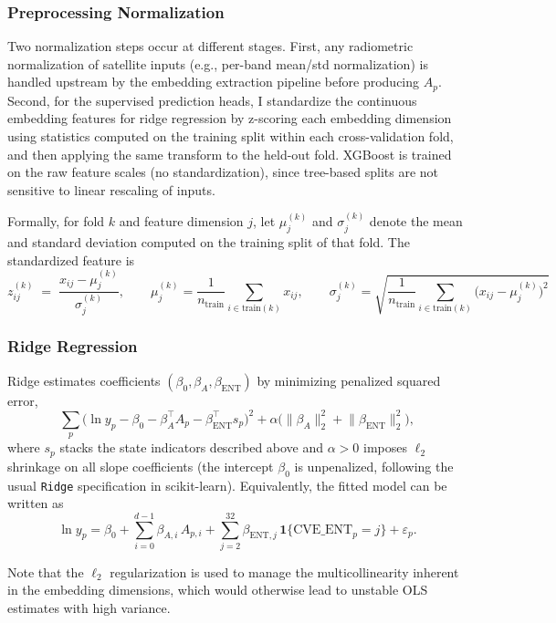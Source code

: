 \documentclass[12pt,letterpaper]{article}
\begin{document}
\subsubsection{Preprocessing Normalization}
Two normalization steps occur at different stages. First, any radiometric normalization of satellite inputs (e.g., per-band mean/std normalization) is handled upstream by the embedding extraction pipeline before producing $A_p$. Second, for the supervised prediction heads, I standardize the continuous embedding features for ridge regression by z-scoring each embedding dimension using statistics computed on the training split within each cross-validation fold, and then applying the same transform to the held-out fold. XGBoost is trained on the raw feature scales (no standardization), since tree-based splits are not sensitive to linear rescaling of inputs.

Formally, for fold $k$ and feature dimension $j$, let $\mu_{j}^{(k)}$ and $\sigma_{j}^{(k)}$ denote the mean and standard deviation computed on the training split of that fold. The standardized feature is
\[
z_{i j}^{(k)} \;=\; \frac{x_{i j} - \mu_{j}^{(k)}}{\sigma_{j}^{(k)}},
\qquad
\mu_{j}^{(k)}=\frac{1}{n_{\mathrm{train}}}\sum_{i \in \mathrm{train}(k)} x_{i j},
\qquad
\sigma_{j}^{(k)}=\sqrt{\frac{1}{n_{\mathrm{train}}}\sum_{i \in \mathrm{train}(k)}\bigl(x_{i j}-\mu_{j}^{(k)}\bigr)^2}
\]

\subsubsection{Ridge Regression}
\label{subsub:ridge}
Ridge estimates coefficients $(\beta_0,\beta_A,\beta_{\mathrm{ENT}})$ by minimizing penalized squared error,
\[
\sum_{p} \bigl(\ln y_p - \beta_0 - \beta_A^\top A_p - \beta_{\mathrm{ENT}}^\top s_p\bigr)^2 + \alpha \bigl(\lVert \beta_A \rVert_2^2 + \lVert \beta_{\mathrm{ENT}} \rVert_2^2\bigr),
\]
where $s_p$ stacks the state indicators described above and $\alpha>0$ imposes $\ell_2$ shrinkage on all slope coefficients (the intercept $\beta_0$ is unpenalized, following the usual \texttt{Ridge} specification in scikit-learn). Equivalently, the fitted model can be written as
\begin{equation}
\label{eq:ridge_prediction_head}
\ln y_p
  = \beta_0
  + \sum_{i=0}^{d-1} \beta_{A,i}\, A_{p,i}
  + \sum_{j=2}^{32} \beta_{\mathrm{ENT},j}\,\textbf{1}\{\mathrm{CVE\_ENT}_p=j\}
  + \varepsilon_p .
\end{equation}

Note that the $\ell_2$ regularization is used to manage the multicollinearity inherent in the embedding dimensions, which would otherwise lead to unstable OLS estimates with high variance.
\end{document}
